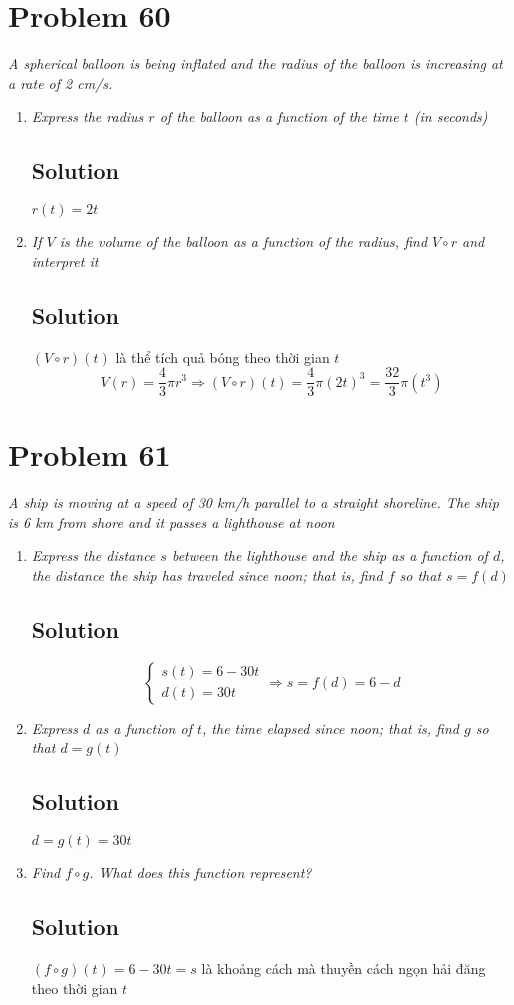 \documentclass[11pt]{article}
\newcommand{\soln}{\subsection*}
\newcommand{\qn}{\textit}
\begin{document}
\section*{Problem 60}

\qn{A spherical balloon is being inflated and the radius of the balloon is increasing at a rate of 2 cm/s.}

\begin{enumerate}
	\item \qn{Express the radius $r$ of the balloon as a function of the time $t$ (in seconds)}
	\soln{Solution}
	$r(t)=2t$
	
	\item \qn{If $V$ is the volume of the balloon as a function of the radius, find $V \circ r$ and interpret it}
	\soln{Solution}
	$(V \circ r)(t)$ là thể tích quả bóng theo thời gian $t$
	$$V(r)=\frac{4}{3}\pi{r^3} \Rightarrow (V \circ r)(t)=\frac{4}{3}\pi(2t)^3=\frac{32}{3}\pi(t^3)$$
\end{enumerate}

\section*{Problem 61}

\qn{A ship is moving at a speed of 30 km/h parallel to a straight shoreline. The ship is 6 km from shore and it passes a lighthouse at noon}

\begin{enumerate}
	\item \qn{Express the distance $s$ between the lighthouse and the ship as a function of $d$, the distance the ship has traveled since noon; that is, find $f$ so that $s=f(d)$}
	\soln{Solution}
	\begin{equation*}
		\begin{cases}
			s(t)=6-30t \\
			d(t)=30t
		\end{cases}
		\Rightarrow
		s=f(d)=6-d
	\end{equation*}
	
	\item \qn{Express $d$ as a function of $t$, the time elapsed since noon; that is, find $g$ so that $d=g(t)$}
	\soln{Solution}
	$d=g(t)=30t$
	
	\item \qn{Find $f \circ g$. What does this function represent?}
	\soln{Solution}
	$(f \circ g)(t)=6-30t=s$ là khoảng cách mà thuyền cách ngọn hải đăng theo thời gian $t$
\end{enumerate}
\end{document}
